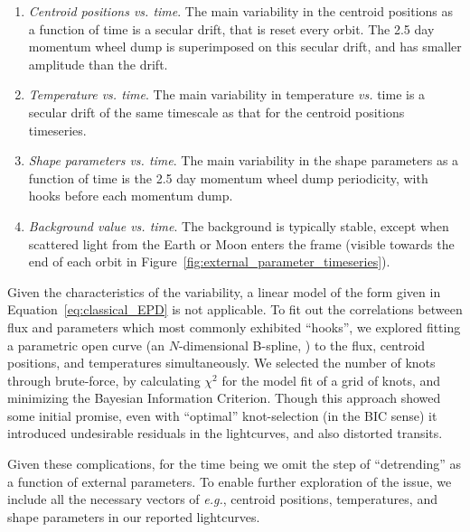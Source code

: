 \documentclass[12pt,twocolumn,tighten]{aastex62}
\begin{document}
\begin{enumerate}

\item {\it Centroid positions vs. time}.  The main variability in the
  centroid positions as a function of time is a secular drift, that is
    reset every orbit.  The 2.5 day momentum wheel dump is
    superimposed on this secular drift, and has smaller amplitude than
    the drift.

\item {\it Temperature vs. time}.  The main variability in temperature
  {\it vs.} time is a secular drift of the same timescale as that for
    the centroid positions timeseries.

\item {\it Shape parameters vs. time}.  The main variability in the
  shape parameters as a function of time is the 2.5 day momentum wheel
    dump periodicity, with hooks before each momentum dump.

\item {\it Background value vs. time}.  The background is typically stable, 
except when scattered light from the Earth or Moon enters the frame (visible 
towards the end of each orbit in 
Figure~\ref{fig:external_parameter_timeseries}).

\end{enumerate}

Given the characteristics of the variability, a linear model of the
form given in Equation~\ref{eq:classical_EPD} is not applicable.  To
fit out the correlations between flux and parameters which most
commonly exhibited ``hooks'', we explored fitting a parametric open
curve (an $N$-dimensional B-spline, \citealt{dierckx_curve_1996}) to
the flux, centroid positions, and temperatures simultaneously.  We
selected the number of knots through brute-force, by calculating
$\chi^2$ for the model fit of a grid of knots, and minimizing the
Bayesian Information Criterion.  Though this approach showed some
initial promise, even with ``optimal'' knot-selection (in the BIC
sense) it introduced undesirable residuals in the lightcurves, and
also distorted transits.

Given these complications, for the time being we omit the step of
``detrending'' as a function of external parameters. To
enable further exploration of the issue, we include all the necessary
vectors of {\it e.g.}, centroid positions, temperatures, and shape
parameters in our reported lightcurves.
\end{document}
